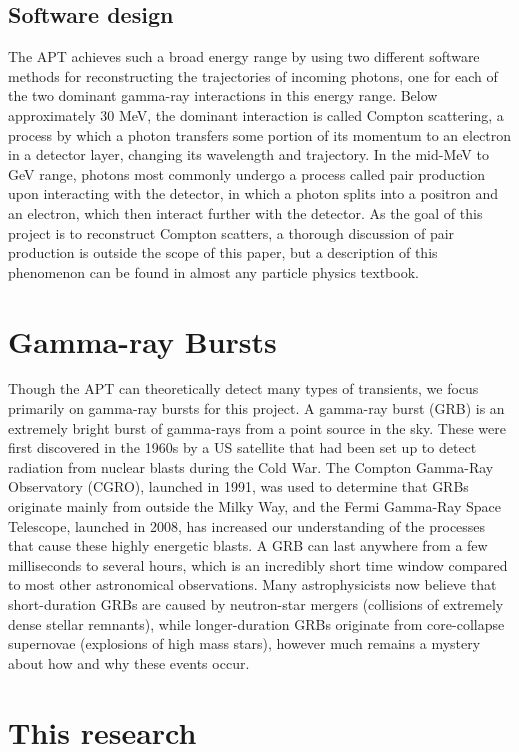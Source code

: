 \subsection{Software design}
The APT achieves such a broad energy range by using two different software methods for reconstructing the trajectories of incoming photons, one for each of the two dominant gamma-ray interactions in this energy range. Below approximately 30 MeV, the dominant interaction is called Compton scattering, a process by which a photon transfers some portion of its momentum to an electron in a detector layer, changing its wavelength and trajectory. In the mid-MeV to GeV range, photons most commonly undergo a process called pair production upon interacting with the detector, in which a photon splits into a positron and an electron, which then interact further with the detector. As the goal of this project is to reconstruct Compton scatters, a thorough discussion of pair production is outside the scope of this paper, but a description of this phenomenon can be found in almost any particle physics textbook.

\section{Gamma-ray Bursts}
Though the APT can theoretically detect many types of transients, we focus primarily on gamma-ray bursts for this project. A gamma-ray burst (GRB) is an extremely bright burst of gamma-rays from a point source in the sky. These were first discovered in the 1960s by a US satellite that had been set up to detect radiation from nuclear blasts during the Cold War. The Compton Gamma-Ray Observatory (CGRO), launched in 1991, was used to determine that GRBs originate mainly from outside the Milky Way, and the Fermi Gamma-Ray Space Telescope, launched in 2008, has increased our understanding of the processes that cause these highly energetic blasts. A GRB can last anywhere from a few milliseconds to several hours, which is an incredibly short time window compared to most other astronomical observations. Many astrophysicists now believe that short-duration GRBs are caused by neutron-star mergers (collisions of extremely dense stellar remnants), while longer-duration GRBs originate from core-collapse supernovae (explosions of high mass stars), however much remains a mystery about how and why these events occur.

\section{This research}
